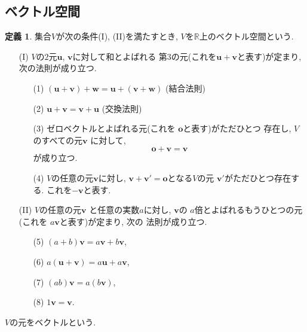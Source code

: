 \documentclass[a4j,12pt]{jarticle}
\theoremstyle{definition}
\newtheorem{definition}[theorem]{定義}
\begin{document}
\subsection{ベクトル空間}\label{def:vector space}
\begin{definition}
    集合$V$が次の条件(I), (II)を満たすとき, 
    $V$を$\mathbb{R}$上のベクトル空間という. 
    \begin{itemize}
        \item[(I)]$V$の$2$元$\boldsymbol{u}$, 
        $\boldsymbol{v}$に対して和とよばれる
        第$3$の元(これを$\boldsymbol{u}+
        \boldsymbol{v}$と表す)が定まり, 
        次の法則が成り立つ.  
        \begin{itemize}
            \item[(1)]
            $(\boldsymbol{u}+
            \boldsymbol{v})+\boldsymbol{w}=
            \boldsymbol{u}+
            (\boldsymbol{v}+\boldsymbol{w})$ 
            (結合法則)
            \item[(2)]
            $\boldsymbol{u}+
            \boldsymbol{v}=
            \boldsymbol{v}+
            \boldsymbol{u}$ 
            (交換法則)
            \item[(3)]
            ゼロベクトルとよばれる元(これを
            $\boldsymbol{o}$と表す)がただひとつ
            存在し, $V$のすべての元$\boldsymbol{v}$
            に対して, 
            $$\boldsymbol{o}+\boldsymbol{v}=
            \boldsymbol{v}$$
            が成り立つ. 
            \item[(4)]
            $V$の任意の元$\boldsymbol{v}$に対し, 
            $\boldsymbol{v}+\boldsymbol{v'}=
            \boldsymbol{o}$となる$V$の元
            $\boldsymbol{v'}$がただひとつ存在する. 
            これを$-\boldsymbol{v}$と表す. 
        \end{itemize} 
        \item[(II)]$V$の任意の元$\boldsymbol{v}$
        と任意の実数$a$に対し, $\boldsymbol{v}$の
        $a$倍とよばれるもうひとつの元(これを
        $a\boldsymbol{v}$と表す)が定まり, 次の
        法則が成り立つ. 
        \begin{itemize}
            \item[(5)]
            $(a+b)\boldsymbol{v}=
            a\boldsymbol{v}+
            b\boldsymbol{v}$,\ 
            \item[(6)]
            $a(\boldsymbol{u}+\boldsymbol{v})=
            a\boldsymbol{u}+a\boldsymbol{v}$,\ 
            \item[(7)]
            $(ab)\boldsymbol{v}=a(b\boldsymbol{v})$,\ 
            \item[(8)]
            $1\boldsymbol{v}=\boldsymbol{v}$. 
        \end{itemize}
    \end{itemize}
    $V$の元をベクトルという. 
\end{definition}
\end{document}
